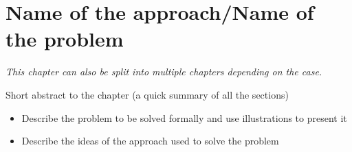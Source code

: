 \chapter{Name of the approach/Name of the problem}
\label{ch:method}

\emph{This chapter can also be split into multiple chapters depending on the case.}

Short abstract to the chapter (a quick summary of all the sections)

\begin{itemize}
\item Describe the problem to be solved formally and use illustrations to present it
\item Describe the ideas of the approach used to solve the problem
\end{itemize}